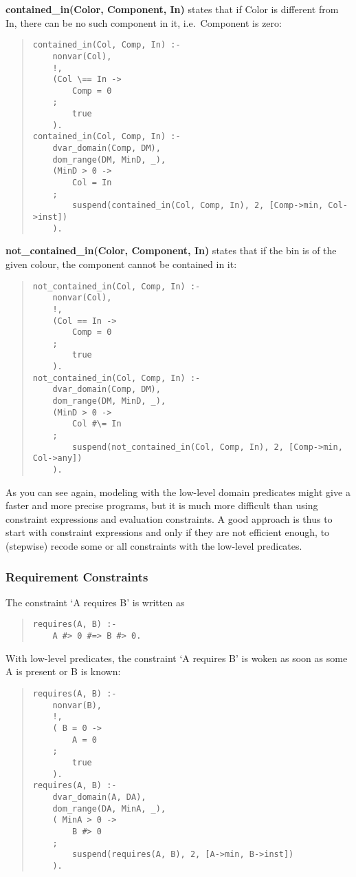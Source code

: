 {\bf contained_in(Color, Component, In)} states that
if Color is different from In, there can be no such component
in it, i.e.\ Component is zero:
\begin{quote}
\begin{verbatim}
contained_in(Col, Comp, In) :-
    nonvar(Col),
    !,
    (Col \== In ->
        Comp = 0
    ;
        true
    ).
contained_in(Col, Comp, In) :-
    dvar_domain(Comp, DM),
    dom_range(DM, MinD, _),
    (MinD > 0 ->
        Col = In
    ;
        suspend(contained_in(Col, Comp, In), 2, [Comp->min, Col->inst])
    ).
\end{verbatim}
\end{quote}

{\bf not_contained_in(Color, Component, In)} states that if the bin is of the given
colour, the component cannot be contained in it:
\begin{quote}
\begin{verbatim}
not_contained_in(Col, Comp, In) :-
    nonvar(Col),
    !,
    (Col == In ->
        Comp = 0
    ;
        true
    ).
not_contained_in(Col, Comp, In) :-
    dvar_domain(Comp, DM),
    dom_range(DM, MinD, _),
    (MinD > 0 ->
        Col #\= In
    ;
        suspend(not_contained_in(Col, Comp, In), 2, [Comp->min, Col->any])
    ).
\end{verbatim}
\end{quote}

As you can see again, modeling with the low-level domain predicates
might give a faster and more precise programs,
but it is much more difficult than using constraint
expressions and evaluation constraints.
A good approach is thus to start with constraint expressions
and only if they are not efficient enough, to (stepwise) recode
some or all constraints with the low-level predicates.

\subsubsection{Requirement Constraints}
The constraint `A requires B' is written as

\begin{quote}
\begin{verbatim}
requires(A, B) :-
    A #> 0 #=> B #> 0.
\end{verbatim}
\end{quote}

With low-level predicates,
the constraint `A requires B' is woken as soon as some
A is present or B is known:
\begin{quote}
\begin{verbatim}
requires(A, B) :-
    nonvar(B),
    !,
    ( B = 0 ->
        A = 0
    ;
        true
    ).
requires(A, B) :-
    dvar_domain(A, DA),
    dom_range(DA, MinA, _),
    ( MinA > 0 ->
        B #> 0
    ;
        suspend(requires(A, B), 2, [A->min, B->inst])
    ).
\end{verbatim}
\end{quote}

